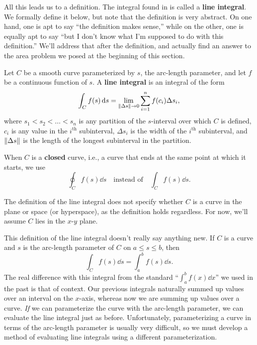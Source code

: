 All this leads us to a definition. The integral found in  is called a \textbf{line integral}. We formally define it below, but note that the definition is very abstract. On one hand, one is apt to say ``the definition makes sense,'' while on the other, one is equally apt to say ``but I don't know what I'm supposed to do with this definition.'' We'll address that after the definition, and actually find an answer to the area problem we posed at the beginning of this section.


\begin{definition}\label{def:line_integral1}%
Let $C$ be a smooth curve parameterized by $s$, the arc-length parameter, and let $f$ be a continuous function of $s$. A \textbf{line integral} is an integral of the form
\[\int_C f(s)\operatorname{d}\! s = \lim_{\left\lVert \Delta s \right\rVert\to 0}\sum_{i=1}^n f(c_i)\Delta s_i,\]
where $s_1<s_2<\dots<s_n$ is any partition of the $s$-interval over which $C$ is defined, $c_i$ is any value in the $i^{\text{th}}$ subinterval,  $\Delta s_i$ is the width of the $i^{\text{th}}$ subinterval, and $\left\lVert \Delta s \right\rVert$ is the length of the longest subinterval in the partition.
\end{definition}

When $C$ is a \textbf{closed} curve, i.e., a curve that ends at the same point at which it starts,  we use
\[\oint_C f(s)\dd s \quad \text{instead of}\quad \int_Cf(s)\dd s.\]

The definition of the line integral does not specify whether $C$ is a curve in the plane or space (or hyperspace), as the definition holds regardless. For now, we'll assume $C$ lies in the $x$-$y$ plane.

This definition of the line integral  doesn't really say anything new. If $C$ is a curve and $s$ is the arc-length parameter of $C$ on $a\leq s\leq b$, then 
\[\int_Cf(s)\dd s = \int_a^bf(s)\dd s.\]
The real difference with this integral from the standard ``$\int_a^bf(x)\dd x$'' we used in the past is that of context. Our previous integrals naturally summed up values over an interval on the $x$-axis, whereas now we are summing up values over a curve. \emph{If} we can parameterize the curve with the arc-length parameter, we can evaluate the line integral just as before. Unfortunately, parameterizing a curve in terms of the arc-length parameter is usually very difficult, so we must develop a method of evaluating line integrals using a different parameterization.

